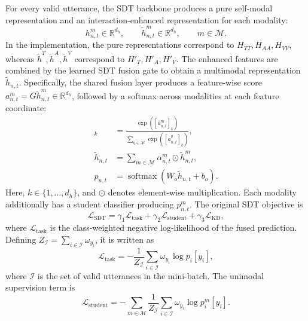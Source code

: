 \documentclass[letterpaper,journal]{IEEEtran}
\begin{document}
For every valid utterance, the SDT backbone produces a pure self-modal
representation and an interaction-enhanced representation for each modality:
\begin{equation}
    h_{n,t}^{m}\in\mathbb{R}^{d_h},
    \qquad
    \widetilde{h}_{n,t}^{m}\in\mathbb{R}^{d_h},
    \qquad m\in\mathcal{M}.
    \label{eq:sdt_representations}
\end{equation}
In the implementation, the pure representations correspond to
\(H_{TT},H_{AA},H_{VV}\), whereas
\(\widetilde{h}^{T},\widetilde{h}^{A},\widetilde{h}^{V}\) correspond to
\(H'_{T},H'_{A},H'_{V}\). The enhanced features are combined by the learned
SDT fusion gate to obtain a multimodal representation
\(\widetilde{h}_{n,t}\). Specifically, the shared fusion layer produces a
feature-wise score
\(a_{n,t}^{m}=G\widetilde{h}_{n,t}^{m}\in\mathbb{R}^{d_h}\), followed by a
softmax across modalities at each feature coordinate:
\begin{align}
    [\alpha_{n,t}^{m}]_k
    &=\frac{\exp([a_{n,t}^{m}]_k)}
    {\sum_{q\in\mathcal{M}}\exp([a_{n,t}^{q}]_k)},
    \label{eq:sdt_fusion_weights}\\
    \widetilde{h}_{n,t}
    &=\sum_{m\in\mathcal{M}}
    \alpha_{n,t}^{m}\odot\widetilde{h}_{n,t}^{m},
    \label{eq:sdt_fusion}\\
    p_{n,t}
    &=\operatorname{softmax}\!\left(W_o\widetilde{h}_{n,t}+b_o\right).
    \label{eq:sdt_output}
\end{align}
Here, \(k\in\{1,\ldots,d_h\}\), and \(\odot\) denotes element-wise
multiplication. Each modality additionally has a student classifier producing
\(p_{n,t}^{m}\). The original SDT objective is
\begin{equation}
    \mathcal{L}_{\mathrm{SDT}}
    =\gamma_1\mathcal{L}_{\mathrm{task}}
    +\gamma_2\mathcal{L}_{\mathrm{student}}
    +\gamma_3\mathcal{L}_{\mathrm{KD}},
    \label{eq:sdt_objective}
\end{equation}
where \(\mathcal{L}_{\mathrm{task}}\) is the class-weighted negative
log-likelihood of the fused prediction. Defining
\(Z_{\mathcal{I}}=\sum_{i\in\mathcal{I}}\omega_{y_i}\), it is written as
\begin{equation}
    \mathcal{L}_{\mathrm{task}}
    =-\frac{1}{Z_{\mathcal{I}}}
    \sum_{i\in\mathcal{I}}\omega_{y_i}\log p_i[y_i],
    \label{eq:sdt_task_loss}
\end{equation}
where \(\mathcal{I}\) is the set of valid utterances in the mini-batch.
The unimodal supervision term is
\begin{equation}
    \mathcal{L}_{\mathrm{student}}
    =-\sum_{m\in\mathcal{M}}
    \frac{1}{Z_{\mathcal{I}}}
    \sum_{i\in\mathcal{I}}
    \omega_{y_i}\log p_i^{m}[y_i].
    \label{eq:sdt_student_loss}
\end{equation}
\end{document}
